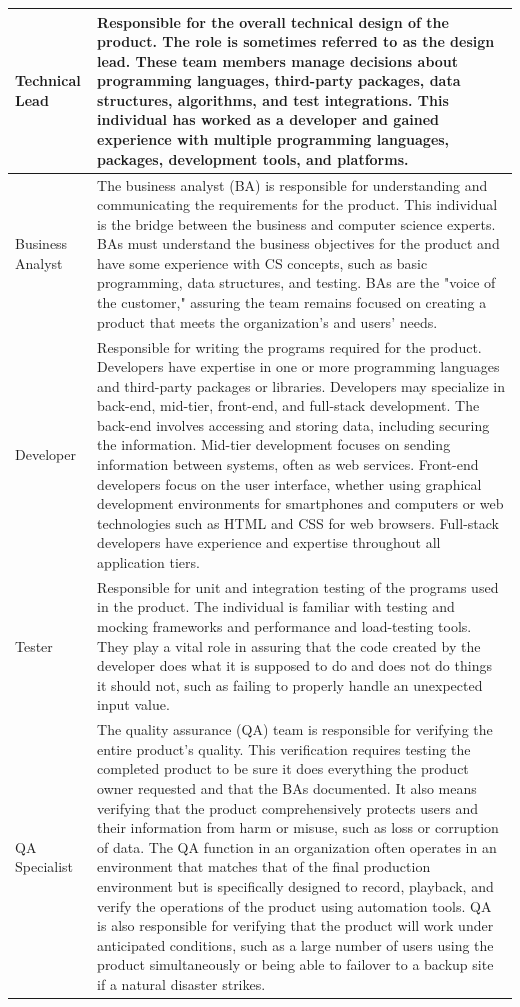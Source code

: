 \begin{longtable}[H]{p{.8in}|p{3.6in}}
	\hline
	\Tstrut Technical Lead & Responsible for the overall technical design of the product. The role is sometimes referred to as the design lead. These team members manage decisions about programming languages, third-party packages, data structures, algorithms, and test integrations. This individual has worked as a developer and gained experience with multiple programming languages, packages, development tools, and platforms.\\
	\hline
	\Tstrut Business Analyst & The business analyst (BA) is responsible for understanding and communicating the requirements for the product. This individual is the bridge between the business and computer science experts. BAs must understand the business objectives for the product and have some experience with CS concepts, such as basic programming, data structures, and testing. BAs are the "voice of the customer," assuring the team remains focused on creating a product that meets the organization's and users' needs.\\
	\hline
	\Tstrut Developer & Responsible for writing the programs required for the product. Developers have expertise in one or more programming languages and third-party packages or libraries. Developers may specialize in back-end, mid-tier, front-end, and full-stack development. The back-end involves accessing and storing data, including securing the information. Mid-tier development focuses on sending information between systems, often as web services. Front-end developers focus on the user interface, whether using graphical development environments for smartphones and computers or web technologies such as HTML and CSS for web browsers. Full-stack developers have experience and expertise throughout all application tiers. \\
	\hline
	\Tstrut Tester & Responsible for unit and integration testing of the programs used in the product. The individual is familiar with testing and mocking frameworks and performance and load-testing tools. They play a vital role in assuring that the code created by the developer does what it is supposed to do and does not do things it should not, such as failing to properly handle an unexpected input value.\\
	\hline
	\Tstrut QA \linebreak Specialist & The quality assurance (QA) team is responsible for verifying the entire product's quality. This verification requires testing the completed product to be sure it does everything the product owner requested and that the BAs documented. It also means verifying that the product comprehensively protects users and their information from harm or misuse, such as loss or corruption of data. The QA function in an organization often operates in an environment that matches that of the final production environment but is specifically designed to record, playback, and verify the operations of the product using automation tools. QA is also responsible for verifying that the product will work under anticipated conditions, such as a large number of users using the product simultaneously or being able to failover to a backup site if a natural disaster strikes.\\

\end{longtable}
